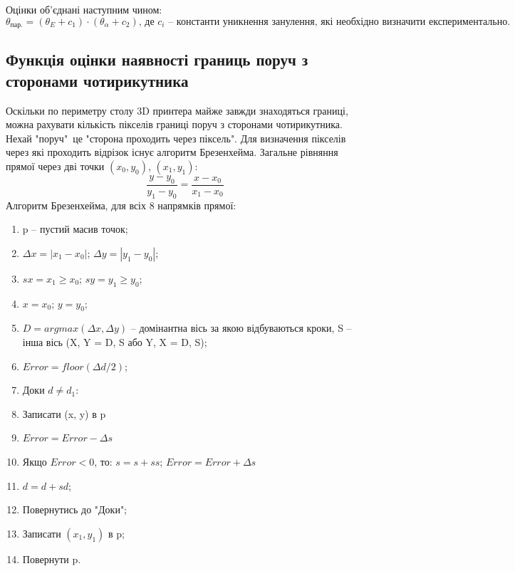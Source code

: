 \documentclass[a4paper,14pt]{report}
\begin{document}
Оцінки об'єднані наступним чином:
\[
\theta_{\text{пар.}} = (\theta_E + c_1) \cdot (\theta_\alpha + c_2)\text{, де }c_i\text{ -- константи уникнення занулення, які необхідно визначити експериментально.}
\]

\subsection{Функція оцінки наявності границь поруч з сторонами чотирикутника}
Оскільки по периметру столу 3D принтера майже завжди знаходяться границі, можна рахувати кількість пікселів границі поруч з сторонами чотирикутника. 
Нехай "поруч"\ це "сторона проходить через піксель". 
Для визначення пікселів через які проходить відрізок існує алгоритм Брезенхейма. 
Загальне рівняння прямої через дві точки $(x_0, y_0)$, $(x_1, y_1)$:
\[
\frac{y-y_0}{y_1-y_0} = \frac{x-x_0}{x_1 - x_0}
\]
Алгоритм Брезенхейма, для всіх 8 напрямків прямої:
\begin{enumerate}
  \item p -- пустий масив точок;
  \item $\Delta x = |x_1 - x_0|$; $\Delta y = |y_1 - y_0|$;
  \item $sx = x_1 \geq x_0$; $sy = y_1 \geq y_0$;
  \item $x = x_0$; $y = y_0$;
  \item $D = argmax(\Delta x, \Delta y)$ -- домінантна вісь за якою відбуваються кроки, S -- інша вісь (X, Y = D, S або Y, X = D, S);
  \item $Error = floor(\Delta d / 2)$;
  \item Доки $d \neq d_1$:
  \item Записати (x, y) в p
  \item $Error = Error -  \Delta s$
  \item Якщо $Error < 0$, то: $s = s + ss$; $Error = Error + \Delta s$
  \item $d = d + sd$;
  \item Повернутись до "Доки";
  \item Записати $(x_1, y_1)$ в p;
  \item Повернути p.
\end{enumerate}
\end{document}
